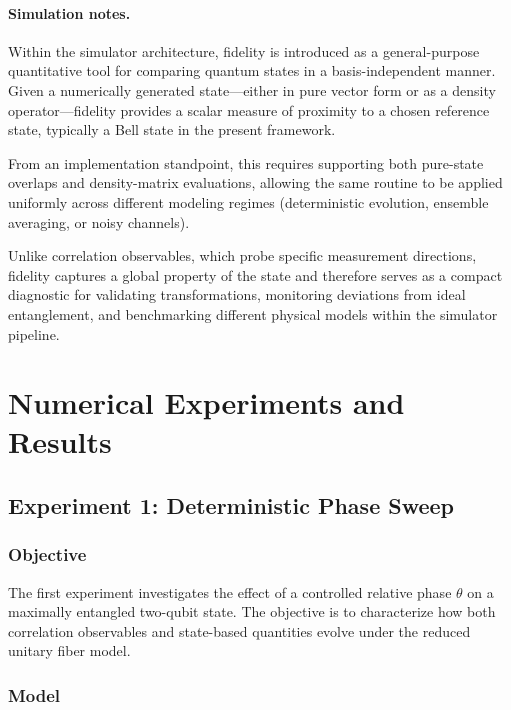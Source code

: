 \documentclass[a4paper]{article}
\begin{document}
\paragraph{Simulation notes.}
Within the simulator architecture, fidelity is introduced as a general-purpose quantitative tool for comparing quantum states in a basis-independent manner. Given a numerically generated state—either in pure vector form or as a density operator—fidelity provides a scalar measure of proximity to a chosen reference state, typically a Bell state in the present framework. 

From an implementation standpoint, this requires supporting both pure-state overlaps and density-matrix evaluations, allowing the same routine to be applied uniformly across different modeling regimes (deterministic evolution, ensemble averaging, or noisy channels). 

Unlike correlation observables, which probe specific measurement directions, fidelity captures a global property of the state and therefore serves as a compact diagnostic for validating transformations, monitoring deviations from ideal entanglement, and benchmarking different physical models within the simulator pipeline.

\section{Numerical Experiments and Results}

\subsection{Experiment 1: Deterministic Phase Sweep}

\subsubsection{Objective}

The first experiment investigates the effect of a controlled relative phase \(\theta\) on a maximally entangled two-qubit state. The objective is to characterize how both correlation observables and state-based quantities evolve under the reduced unitary fiber model.

\subsubsection{Model}
\end{document}
